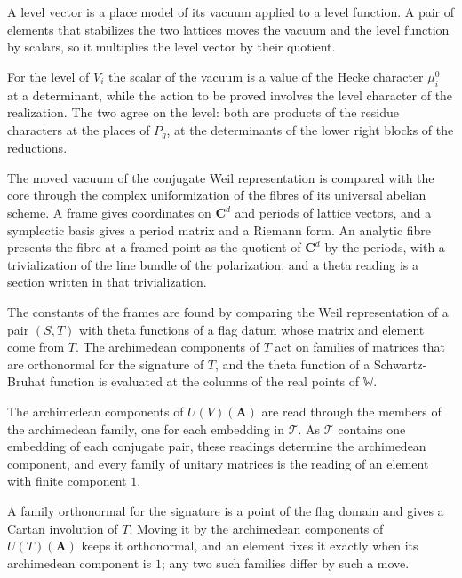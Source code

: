 A level vector is a place model of its vacuum applied to a level function. A pair of elements that
stabilizes the two lattices moves the vacuum and the level function by scalars, so it multiplies the
level vector by their quotient.

For the level of $V_i$ the scalar of the vacuum is a value of the Hecke character $\mu^0_i$ at a
determinant, while the action to be proved involves the level character of the realization. The two
agree on the level: both are products of the residue characters at the places of $P_g$, at the
determinants of the lower right blocks of the reductions.

The moved vacuum of the conjugate Weil representation is compared with the core through the complex
uniformization of the fibres of its universal abelian scheme. A frame gives coordinates on
$\mathbf C^d$ and periods of lattice vectors, and a symplectic basis gives a period matrix and a Riemann
form. An analytic fibre presents the fibre at a framed point as the quotient of $\mathbf C^d$ by the
periods, with a trivialization of the line bundle of the polarization, and a theta reading is a section
written in that trivialization.

The constants of the frames are found by comparing the Weil representation of a pair $(S,T)$ with theta
functions of a flag datum whose matrix and element come from $T$. The archimedean components of $T$ act on
families of matrices that are orthonormal for the signature of $T$, and the theta function of a
Schwartz-Bruhat function is evaluated at the columns of the real points of $\mathbb W$.

The archimedean components of $U(V)(\mathbf A)$ are read through the members of the archimedean family,
one for each embedding in $\mathcal T$. As $\mathcal T$ contains one embedding of each conjugate pair,
these readings determine the archimedean component, and every family of unitary matrices is the reading of
an element with finite component $1$.

A family orthonormal for the signature is a point of the flag domain and gives a Cartan involution of
$T$. Moving it by the archimedean components of $U(T)(\mathbf A)$ keeps it orthonormal, and an element
fixes it exactly when its archimedean component is $1$; any two such families differ by such a move.

